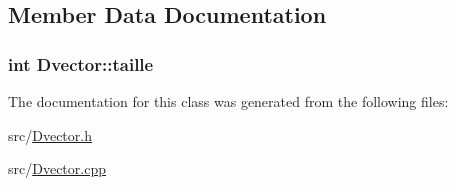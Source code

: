 \subsection{Member Data Documentation}
\hypertarget{classDvector_a728a936adcb2a17365255656c5f94692}{
\subsubsection[{taille}]{\setlength{\rightskip}{0pt plus 5cm}int Dvector\-::taille}}\label{classDvector_a728a936adcb2a17365255656c5f94692}


The documentation for this class was generated from the following files\-:\begin{DoxyCompactItemize}
\item 
src/\hyperlink{Dvector_8h}{Dvector.\-h}\item 
src/\hyperlink{Dvector_8cpp}{Dvector.\-cpp}\end{DoxyCompactItemize}
